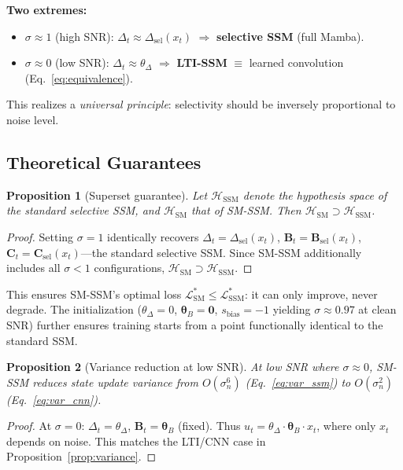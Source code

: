 \documentclass{Interspeech}
\newtheorem{proposition}{Proposition}
\begin{document}
\smallskip\noindent\textbf{Two extremes:}
\begin{itemize}
\setlength\itemsep{0pt}
\item $\sigma \approx 1$ (high SNR): $\Delta_t \approx \Delta_{\text{sel}}(x_t)$ $\Rightarrow$ \textbf{selective SSM} (full Mamba).
\item $\sigma \approx 0$ (low SNR): $\Delta_t \approx \theta_\Delta$ $\Rightarrow$ \textbf{LTI-SSM} $\equiv$ learned convolution (Eq.~\ref{eq:equivalence}).
\end{itemize}

\noindent This realizes a \emph{universal principle}: selectivity should be inversely proportional to noise level.

\subsection{Theoretical Guarantees}
\label{sec:theory}

\begin{proposition}[Superset guarantee]
\label{prop:superset}
Let $\mathcal{H}_{\text{SSM}}$ denote the hypothesis space of the standard selective SSM, and $\mathcal{H}_{\text{SM}}$ that of SM-SSM. Then $\mathcal{H}_{\text{SM}} \supset \mathcal{H}_{\text{SSM}}$.
\end{proposition}
\begin{proof}
Setting $\sigma{=}1$ identically recovers $\Delta_t = \Delta_{\text{sel}}(x_t)$, $\mathbf{B}_t = \mathbf{B}_{\text{sel}}(x_t)$, $\mathbf{C}_t = \mathbf{C}_{\text{sel}}(x_t)$---the standard selective SSM.
Since SM-SSM additionally includes all $\sigma{<}1$ configurations, $\mathcal{H}_{\text{SM}} \supset \mathcal{H}_{\text{SSM}}$.
\end{proof}

This ensures SM-SSM's optimal loss $\mathcal{L}^*_{\text{SM}} \leq \mathcal{L}^*_{\text{SSM}}$: it can only improve, never degrade.
The initialization ($\theta_\Delta{=}0$, $\bm{\theta}_B{=}\mathbf{0}$, $s_{\text{bias}}{=}{-1}$ yielding $\sigma{\approx}0.97$ at clean SNR) further ensures training starts from a point functionally identical to the standard SSM.

\begin{proposition}[Variance reduction at low SNR]
\label{prop:var_reduction}
At low SNR where $\sigma \approx 0$, SM-SSM reduces state update variance from $O(\sigma_n^6)$ (Eq.~\ref{eq:var_ssm}) to $O(\sigma_n^2)$ (Eq.~\ref{eq:var_cnn}).
\end{proposition}
\begin{proof}
At $\sigma{=}0$: $\Delta_t = \theta_\Delta$, $\mathbf{B}_t = \bm{\theta}_B$ (fixed). Thus $u_t = \theta_\Delta \cdot \bm{\theta}_B \cdot x_t$, where only $x_t$ depends on noise. This matches the LTI/CNN case in Proposition~\ref{prop:variance}.
\end{proof}
\end{document}
